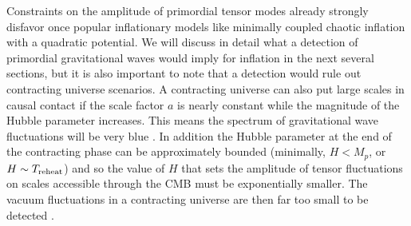 Constraints on the amplitude of primordial tensor modes already strongly disfavor once popular inflationary models like minimally coupled chaotic inflation with a quadratic potential.  We will discuss in detail what a detection of primordial gravitational waves would imply for inflation in the next several sections, but it is also important to note that a detection would rule out contracting universe scenarios. A contracting universe can also put large scales in causal contact if the scale factor $a$ is nearly constant while the magnitude of the Hubble parameter increases. This means the spectrum of gravitational wave fluctuations will be very blue \cite{Khoury:2001wf}. In addition the Hubble parameter at the end of the contracting phase can be approximately bounded (minimally, $H<M_p$, or $H\sim T_{\rm reheat}$) and so the value of $H$ that sets the amplitude of tensor fluctuations on scales accessible through the CMB must be exponentially smaller. The vacuum fluctuations in a contracting universe are then far too small to be detected \cite{Boyle:2003km}.

%


